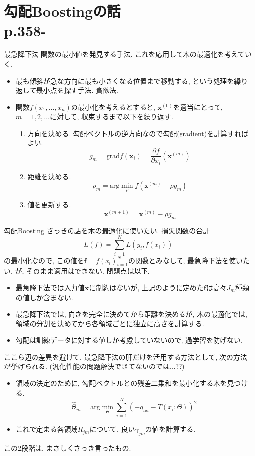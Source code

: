 \documentclass[dvipdfmx,8pt]{beamer}
\begin{document}
  \section{勾配Boostingの話\\p.358-}
  \begin{frame}{最急降下法}
    関数の最小値を発見する手法. これを応用して木の最適化を考えていく.
    \begin{itemize}
      \item 最も傾斜が急な方向に最も小さくなる位置まで移動する, という処理を繰り返して最小点を探す手法. 貪欲法.
      \item 関数$f(x_1,\dots,x_n)$の最小化を考えるとすると, $\mathbf{x}^{(0)}$を適当にとって, $m=1,2,\dots$に対して, 収束するまで以下を繰り返す.
      \begin{enumerate}
        \item 方向を決める. 勾配ベクトルの逆方向なので勾配(gradient)を計算すればよい.         \[
          g_m=\mathrm{grad}f(\mathbf{x}_i)=\frac{\partial f}{\partial x_i}(\mathbf{x}^{(m)})
        \]
        \item 距離を決める.
        \[
          \rho_m=\mathrm{arg}\min_{\rho}f(\mathbf{x}^{(m)}-\rho g_m)
        \]
        \item 値を更新する.
        \[
          \mathbf{x}^{(m+1)}=\mathbf{x}^{(m)}-\rho g_m
        \]
      \end{enumerate}
    \end{itemize}
  \end{frame}
  \begin{frame}{勾配Boosting}
    さっきの話を木の最適化に使いたい. 損失関数の合計
    \[
      L(f)=\sum_{i=1}^{N}L(y_i,f(x_i))
    \]
    の最小化なので, この値を$\mathbf{f}={f(x_i)}_{i=1}^{N}$の関数とみなして, 最急降下法を使いたい. が, そのまま適用はできない. 問題点は以下.
    \begin{itemize}
      \item 最急降下法では入力値$\mathbf{x}$に制約はないが, 上記のように定めた$\mathbf{f}$は高々$J_m$種類の値しか含まない.
      \item 最急降下法では, 向きを完全に決めてから距離を決めるが, 木の最適化では, 領域の分割を決めてから各領域ごとに独立に高さを計算する.
      \item 勾配は訓練データに対する値しか考慮していないので, 過学習を防げない.
    \end{itemize}
    ここら辺の差異を避けて, 最急降下法の肝だけを活用する方法として, 次の方法が挙げられる. (汎化性能の問題解決できてないのでは...??)
    \begin{itemize}
      \item 領域の決定のために, 勾配ベクトルとの残差二乗和を最小化する木を見つける.
      \[
        \hat{\Theta}_m=\mathrm{arg}\min_{\Theta}\sum_{i=1}^{N}(-g_{im}-T(x_i;\Theta))^2
      \]
      \item これで定まる各領域$R_{jm}$について, 良い$\gamma_{jm}$の値を計算する.
    \end{itemize}
    この2段階は, まさしくさっき言ったもの.
  \end{frame}
\end{document}
